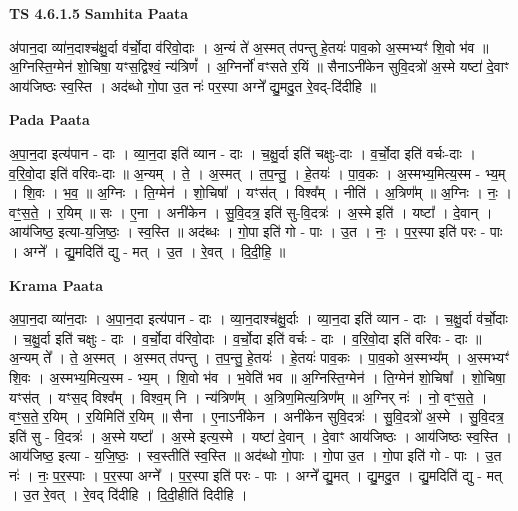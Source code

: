 \documentclass[17pt]{extarticle}
\begin{document}
\textbf{TS 4.6.1.5 } \newline
\textbf{Samhita Paata} \newline

अ॑पान॒दा व्या॑न॒दाश्च॑क्षु॒र्दा व॑र्चो॒दा व॑रिवो॒दाः । अ॒न्यं ते॑ अ॒स्मत् त॑पन्तु हे॒तयः॑ पाव॒को अ॒स्मभ्यꣳ॑ शि॒वो भ॑व ॥ अ॒ग्निस्ति॒ग्मेन॑ शो॒चिषा॒ यꣳस॒द्विश्वं॒ न्य॑त्रिणं᳚ । अ॒ग्निर्नो॑ वꣳसते र॒यिं ॥ सैनाऽनी॑केन सुवि॒दत्रो॑ अ॒स्मे यष्टा॑ दे॒वाꣳ आय॑जिष्ठः स्व॒स्ति । अद॑ब्धो गो॒पा उ॒त नः॑ पर॒स्पा अग्ने᳚ द्यु॒मदु॒त रे॒वद्-दि॑दीहि ॥ \newline

\textbf{Pada Paata} \newline

अ॒पा॒न॒दा इत्य॑पान - दाः । व्या॒न॒दा इति॑ व्यान - दाः । च॒क्षु॒र्दा इति॑ चक्षुः-दाः । व॒र्चो॒दा इति॑ वर्चः-दाः । व॒रि॒वो॒दा इति॑ वरिवः-दाः ॥ अ॒न्यम् । ते॒ । अ॒स्मत् । त॒प॒न्तु॒ । हे॒तयः॑ । पा॒व॒कः । अ॒स्मभ्य॒मित्य॒स्म - भ्य॒म् । शि॒वः । भ॒व॒ ॥ अ॒ग्निः । ति॒ग्मेन॑ । शो॒चिषा᳚ । यꣳस॑त् । विश्व᳚म् । नीति॑ । अ॒त्रिण᳚म् ॥ अ॒ग्निः । नः॒ । वꣳ॒॒स॒ते॒ । र॒यिम् ॥ सः । ए॒ना । अनी॑केन । सु॒वि॒दत्र॒ इति॑ सु-वि॒दत्रः॑ । अ॒स्मे इति॑ । यष्टा᳚ । दे॒वान् । आय॑जिष्ठ॒ इत्या-य॒जि॒ष्ठः॒ । स्व॒स्ति ॥ अद॑ब्धः । गो॒पा इति॑ गो - पाः । उ॒त । नः॒ । प॒र॒स्पा इति॑ परः - पाः । अग्ने᳚ । द्यु॒मदिति॑ द्यु - मत् । उ॒त । रे॒वत् । दि॒दी॒हि॒ ॥  \newline


\textbf{Krama Paata} \newline

अ॒पा॒न॒दा व्या॑न॒दाः । अ॒पा॒न॒दा इत्य॑पान - दाः । व्या॒न॒दाश्च॑क्षु॒र्दाः । व्या॒न॒दा इति॑ व्यान - दाः । च॒क्षु॒र्दा व॑र्चो॒दाः । च॒क्षु॒र्दा इति॑ चक्षुः - दाः । व॒र्चो॒दा व॑रिवो॒दाः । व॒र्चो॒दा इति॑ वर्चः - दाः । व॒रि॒वो॒दा इति॑ वरिवः - दाः ॥ अ॒न्यम् ते᳚ । ते॒ अ॒स्मत् । अ॒स्मत् त॑पन्तु । त॒प॒न्तु॒ हे॒तयः॑ । हे॒तयः॑ पाव॒कः । पा॒व॒को अ॒स्मभ्य᳚म् । अ॒स्मभ्यꣳ॑ शि॒वः । अ॒स्मभ्य॒मित्य॒स्म - भ्य॒म् । शि॒वो भ॑व । भ॒वेति॑ भव ॥ अ॒ग्निस्ति॒ग्मेन॑ । ति॒ग्मेन॑ शो॒चिषा᳚ । शो॒चिषा॒ यꣳस॑त् । यꣳस॒द् विश्व᳚म् । विश्व॒म् नि । न्य॑त्रिण᳚म् । अ॒त्रिण॒मित्य॒त्रिण᳚म् ॥ अ॒ग्निर् नः॑ । नो॒ वꣳ॒॒स॒ते॒ । वꣳ॒॒स॒ते॒ र॒यिम् । र॒यिमिति॑ र॒यिम् ॥ सैना । ए॒नाऽनी॑केन । अनी॑केन सुवि॒दत्रः॑ । सु॒वि॒दत्रो॑ अ॒स्मे । सु॒वि॒दत्र॒ इति॑ सु - वि॒दत्रः॑ । अ॒स्मे यष्टा᳚ । अ॒स्मे इत्य॒स्मे । यष्टा॑ दे॒वान् । दे॒वाꣳ आय॑जिष्ठः । आय॑जिष्ठः स्व॒स्ति । आय॑जिष्ठ॒ इत्या - य॒जि॒ष्ठः॒ । स्व॒स्तीति॑ स्व॒स्ति ॥ अद॑ब्धो गो॒पाः । गो॒पा उ॒त । गो॒पा इति॑ गो - पाः । उ॒त नः॑ । नः॒ प॒र॒स्पाः । प॒र॒स्पा अग्ने᳚ । प॒र॒स्पा इति॑ परः - पाः । अग्ने᳚ द्यु॒मत् । द्यु॒मदु॒त । द्यु॒मदिति॑ द्यु - मत् । उ॒त रे॒वत् । रे॒वद् दि॑दीहि । 
दि॒दी॒हीति॑ दिदीहि । \newline
\end{document}

